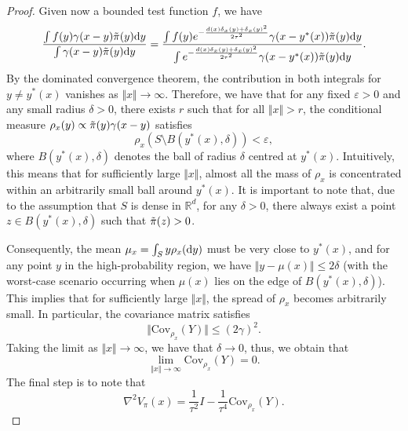 \begin{proof}
Given now a bounded test function $f$, we have
\begin{equation*}
    \frac{\int f(y)\gamma(x-y)\Tilde{\pi}(y)\mathrm{d} y}{\int\gamma(x-y)\Tilde{\pi}(y)\mathrm{d} y}  = \frac{\int f(y) e^{-\frac{d(x)\delta_x(y) + \delta_x(y)^2}{2\tau^2}}\gamma(x-y^*(x))\Tilde{\pi}(y)\mathrm{d} y}{\int e^{-\frac{d(x)\delta_x(y) + \delta_x(y)^2}{2\tau^2}}\gamma(x-y^*(x))\Tilde{\pi}(y)\mathrm{d} y}.
\end{equation*}
By the dominated convergence theorem, the contribution in both integrals for $y\neq y^*(x)$ vanishes as $\Vert x\Vert\to \infty$. Therefore, we have that for any fixed $\varepsilon>0$ and any small radius $\delta>0$, there exists $r$ such that for all $\Vert x\Vert>r$, the conditional measure $\rho_x(y)\propto \Tilde{\pi}(y)\gamma(x-y)$ satisfies
\begin{equation*}
    \rho_x\left(S\setminus B(y^*(x), \delta) \right)<\varepsilon,
\end{equation*}
where $B(y^*(x), \delta)$ denotes the ball of radius $\delta$ centred at $y^*(x)$. 
Intuitively, this means that for sufficiently large $\Vert x\Vert$, almost all the mass of $\rho_x$ is concentrated within an arbitrarily small ball around $y^*(x)$. 
It is important to note that, due to the assumption that $S$ is dense in $\mathbb{R}^d$, for any $\delta>0$, there always exist a point $z\in B(y^*(x), \delta)$ such that $\Tilde{\pi}(z)>0$.

Consequently, the mean $\mu_x = \int_S y\rho_x(\mathrm{d} y)$ must be very close to $y^*(x)$, and for any point $y$ in the high-probability region, we have $\Vert y-\mu(x)\Vert\leq 2\delta$ (with the worst-case scenario occurring when $\mu(x)$ lies on the edge of $B(y^*(x), \delta)$). This implies that for sufficiently large $\Vert x\Vert$, the spread of $\rho_x$ becomes arbitrarily small. In particular, the covariance matrix satisfies
\begin{equation*}
    \Vert\text{Cov}_{\rho_x}(Y)\Vert\leq (2\gamma)^2.
\end{equation*}
Taking the limit as $\Vert x\Vert \to\infty$, we have that $\delta\to0$, thus, we obtain that 
\begin{equation*}
    \lim_{\Vert x\Vert\to\infty}\text{Cov}_{\rho_x}(Y) = 0.
\end{equation*}
The final step is to note that 
\begin{equation*}
    \nabla^2 V_\pi(x) = \frac{1}{\tau^2} I -\frac{1}{\tau^4}\text{Cov}_{\rho_x}(Y).
\end{equation*}




\end{proof}